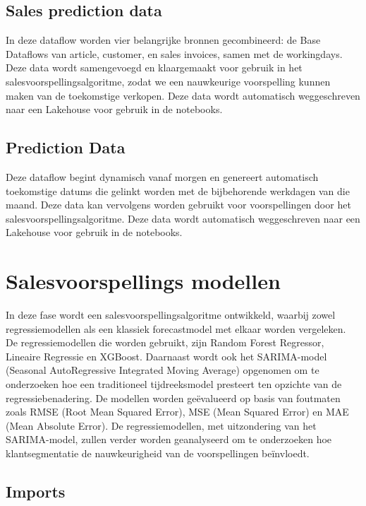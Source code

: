 \subsection*{Sales prediction data}

In deze dataflow worden vier belangrijke bronnen gecombineerd: de Base Dataflows van article, customer, en sales invoices, samen met de workingdays. Deze data wordt samengevoegd en klaargemaakt voor gebruik in het salesvoorspellingsalgoritme, zodat we een nauwkeurige voorspelling kunnen maken van de toekomstige verkopen. Deze data wordt automatisch weggeschreven naar een Lakehouse voor gebruik in de notebooks.

\subsection*{Prediction Data}

Deze dataflow begint dynamisch vanaf morgen en genereert automatisch toekomstige datums die gelinkt worden met de bijbehorende werkdagen van die maand. Deze data kan vervolgens worden gebruikt voor voorspellingen door het salesvoorspellingsalgoritme. Deze data wordt automatisch weggeschreven naar een Lakehouse voor gebruik in de notebooks.

\newpage

\section{Salesvoorspellings modellen}


In deze fase wordt een salesvoorspellingsalgoritme ontwikkeld, waarbij zowel regressiemodellen als een klassiek forecastmodel met elkaar worden vergeleken. De regressiemodellen die worden gebruikt, zijn Random Forest Regressor, Lineaire Regressie en XGBoost. Daarnaast wordt ook het SARIMA-model (Seasonal AutoRegressive Integrated Moving Average) opgenomen om te onderzoeken hoe een traditioneel tijdreeksmodel presteert ten opzichte van de regressiebenadering. De modellen worden geëvalueerd op basis van foutmaten zoals RMSE (Root Mean Squared Error), MSE (Mean Squared Error) en MAE (Mean Absolute Error). De regressiemodellen, met uitzondering van het SARIMA-model, zullen verder worden geanalyseerd om te onderzoeken hoe klantsegmentatie de nauwkeurigheid van de voorspellingen beïnvloedt.

\subsection{Imports}

